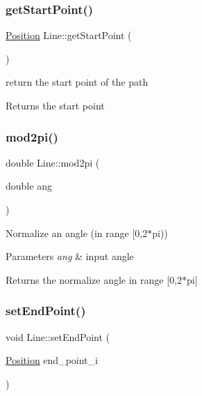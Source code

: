 \subsubsection{\texorpdfstring{get\+Start\+Point()}{getStartPoint()}}
{\footnotesize\ttfamily \mbox{\hyperlink{class_position}{Position}} Line\+::get\+Start\+Point (\begin{DoxyParamCaption}{ }\end{DoxyParamCaption})}



return the start point of the path 

\begin{DoxyReturn}{Returns}
the start point 
\end{DoxyReturn}
\mbox{\label{class_line_aa30f3bd50c4de544874c4aaad0a24c6a}} 
\subsubsection{\texorpdfstring{mod2pi()}{mod2pi()}}
{\footnotesize\ttfamily double Line\+::mod2pi (\begin{DoxyParamCaption}\item[{double}]{ang }\end{DoxyParamCaption})}



Normalize an angle (in range \mbox{[}0,2$\ast$pi)) 


\begin{DoxyParams}{Parameters}
{\em ang} & input angle \\
\hline
\end{DoxyParams}
\begin{DoxyReturn}{Returns}
the normalize angle in range \mbox{[}0,2$\ast$pi\mbox{]} 
\end{DoxyReturn}
\mbox{\label{class_line_a47359d43675ff78f2b0af8378d952387}} 
\subsubsection{\texorpdfstring{set\+End\+Point()}{setEndPoint()}}
{\footnotesize\ttfamily void Line\+::set\+End\+Point (\begin{DoxyParamCaption}\item[{\mbox{\hyperlink{class_position}{Position}}}]{end\+\_\+point\+\_\+i }\end{DoxyParamCaption})}



